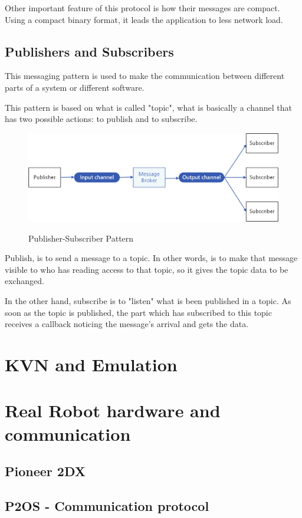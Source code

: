 \documentclass[../monografia.tex]{subfiles}
\begin{document}
Other important feature of this protocol is how their messages are compact. Using a compact binary format, it leads the application to less network load.

\section{Publishers and Subscribers}
This messaging pattern \cite{publisher_subscriber} is used to make the communication between different parts of a system or different software.

This pattern is based on what is called "topic", what is basically a channel that has two possible actions: to publish and to subscribe.

\begin{figure}[h]
\centering
    \caption{Publisher-Subscriber Pattern}
    \centering %
    \includegraphics[width=14cm]{publish-subscribe.png}
    \label{fig: publisher subscriber pattern}
\end{figure}

Publish, is to send a message to a topic. In other words, is to make that message visible to who has reading access to that topic, so it gives the topic data to be exchanged.

In the other hand, subscribe is to "listen" what is been published in a topic. As soon as the topic is published, the part which has subscribed to this topic receives a callback noticing the message's arrival and gets the data.

\chapter{KVN and Emulation}

\chapter{Real Robot hardware and communication}

\section{Pioneer 2DX}

\section{P2OS - Communication protocol}
\end{document}
